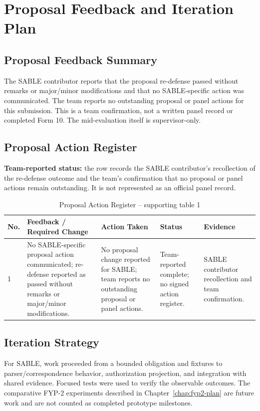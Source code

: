 \chapter{Proposal Feedback and Iteration Plan}
\section{Proposal Feedback Summary}
The SABLE contributor reports that the proposal re-defense passed without remarks or major/minor modifications and that no SABLE-specific action was communicated. The team reports no outstanding proposal or panel actions for this submission. This is a team confirmation, not a written panel record or completed Form 10. The mid-evaluation itself is supervisor-only.
\section{Proposal Action Register}
\textbf{Team-reported status:} the row records the SABLE contributor's recollection of the re-defense outcome and the team's confirmation that no proposal or panel actions remain outstanding. It is not represented as an official panel record.
\begin{longtable}{p{}p{}p{}p{}p{}}
\caption{Proposal Action Register -- supporting table 1}\\
\toprule
No. & Feedback / Required Change & Action Taken & Status & Evidence\\
\midrule
1 & No SABLE-specific proposal action communicated; re-defense reported as passed without remarks or major/minor modifications. & No proposal change reported for SABLE; team reports no outstanding proposal or panel actions. & Team-reported complete; no signed action register. & SABLE contributor recollection and team confirmation.\\
\bottomrule
\end{longtable}
\section{Iteration Strategy}
\begin{sloppypar}
For SABLE, work proceeded from a bounded obligation and fixtures to parser/correspondence behavior, authorization projection, and integration with shared evidence. Focused tests were used to verify the observable outcomes. The comparative FYP-2 experiments described in Chapter~\ref{chap:fyp2-plan} are future work and are not counted as completed prototype milestones.
\end{sloppypar}
